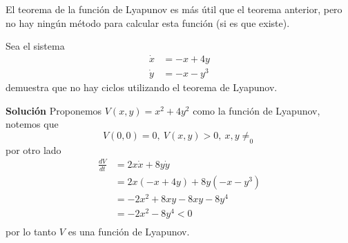 \begin{tcolorbox}[colback=Black!4, colframe=White, arc=2mm]
\begin{nota}El teorema de la función de Lyapunov es más útil que el teorema anterior, pero no hay ningún método para calcular esta función (si es que existe).
\end{nota}
\end{tcolorbox}

\begin{ejemplo} Sea el sistema $$
\begin{aligned}
  \dot{x} &= -x + 4y \\ 
  \dot{y} &= -x-y^3
\end{aligned}
$$
demuestra que no hay ciclos utilizando el teorema de Lyapunov.
\begin{tcolorbox}[colback=Black!4, colframe=White, arc = 2mm]
\textbf{Solución}
Proponemos $V(x,y)=x^2+4y^2$ como la función de Lyapunov, notemos que
$$
V(0,0) = 0 ,\ V(x,y)>0 ,\ x,y \neq_0
$$
por otro lado $$
\begin{aligned}
  \frac{dV}{dt} &= 2x \dot{x} + 8y\dot{y} \\ 
  &= 2x(-x+4y)+8y(-x-y^3) \\
  &= -2x^2+8xy-8xy-8y^{4} \\
  &= -2x^2-8y^{4} < 0 \\ 
\end{aligned}
$$
por lo tanto $V$ es una función de Lyapunov.
\end{tcolorbox} 
\end{ejemplo}
